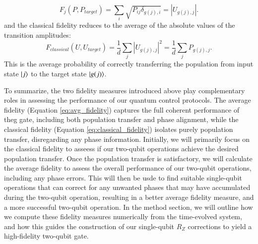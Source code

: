\documentclass{subfiles}
\begin{document}
\begin{itemize}
    \begin{equation*}
        F_j(P, P_{target}) = \sum_i \sqrt{P_{ij} \delta_{g(j),i}} = |U_{g(j), j}|.
    \end{equation*}
    and the classical fidelity reduces to the average of the absolute values of the transition amplitudes:
    \begin{equation}
        F_{classical}(U, U_{target}) = \frac{1}{d}\sum_j |U_{g(j), j}|^2 = \frac{1}{d}\sum_j P_{g(j), j}\label{eq:classical_fidelity_deterministic}.
    \end{equation}
    This is the average probability of correctly transferring the population from input state $\ket{j}$ to the target state $\ket{g(j)}$. 
\end{itemize}
To summarize, the two fidelity measures introduced above play complementary roles in assessing the performance of our quantum control protocols. The average fidelity (Equation \eqref{eq:avg_fidelity}) captures the full coherent performance of theg gate, including both population transfer and phase alignment, while the classical fidelity (Equation \eqref{eq:classical_fidelity}) isolates purely population transfer, disregarding any phase information. Initially, we will primarily focus on the classical fidelity to asseess if our two-qubit operations achieve the desired population transfer. Once the population transfer is satisfactory, we will calculate the average fidelity to assess the overall performance of our two-qubit operations, including any phase errors. This will then be usde to find suitable single-qubit operations that can correct for any unwanted phases that may have accumulated during the two-qubit operation, resulting in a better average fidelity measure, and a more successful two-qubit operation. In the method section, we will outline how we compute these fidelity measures numerically from the time-evolved system, and how this guides the construction of our single-qubit $R_Z$ corrections to yield a high-fidelity two-qubit gate.
\end{document}
